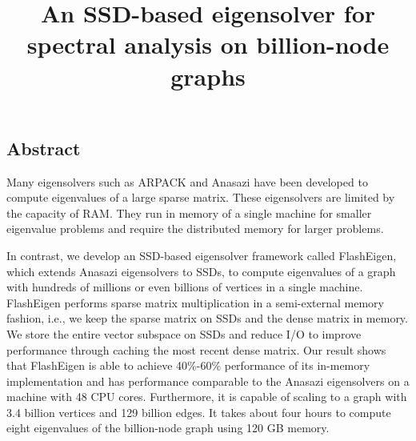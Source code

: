 \documentclass[letterpaper,twocolumn,10pt]{article}
\begin{document}
\date{}

\title{An SSD-based eigensolver for spectral analysis on billion-node graphs}


\maketitle

\thispagestyle{empty}


\subsection*{Abstract}
Many eigensolvers such as ARPACK and Anasazi have been developed to compute
eigenvalues of a large sparse matrix. These eigensolvers are limited by
the capacity of RAM. They run in memory of a single machine for smaller
eigenvalue problems and require the distributed memory for larger problems.

In contrast, we develop an SSD-based eigensolver framework called FlashEigen,
which extends Anasazi eigensolvers to SSDs, to compute eigenvalues of a graph
with hundreds of millions or even billions of vertices in a single machine.
FlashEigen performs sparse matrix multiplication in a semi-external memory
fashion, i.e., we keep the sparse matrix on SSDs and the dense matrix in memory.
We store the entire vector subspace on SSDs and reduce I/O to improve
performance through caching the most recent dense matrix.
Our result shows that FlashEigen is able to achieve 40\%-60\% performance
of its in-memory implementation and has performance comparable to the Anasazi
eigensolvers on a machine with 48 CPU cores. Furthermore, it is capable of
scaling to a graph with 3.4 billion vertices and 129 billion edges. It takes
about four hours to compute eight eigenvalues of the billion-node graph using
120 GB memory.
\end{document}
